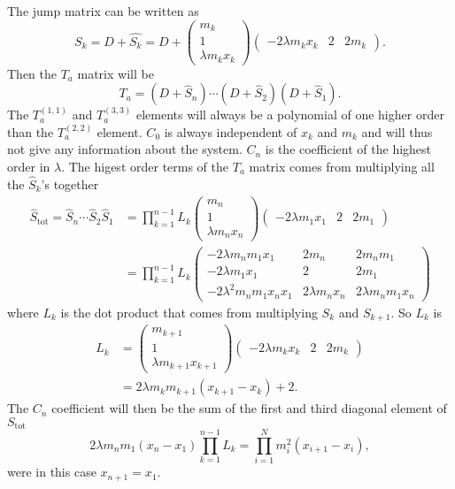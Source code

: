 \documentclass[english,master]{liumaiex}
\theoremstyle{plain}
\theoremstyle{definition}
\begin{document}
The jump matrix can be written as
\begin{equation}
	S_k = D + \hat{S_k} = D + 
	\begin{pmatrix}
		m_k \\ 1 \\ \lambda m_k x_k		
	\end{pmatrix}
	\begin{pmatrix}
		-2 \lambda m_k x_k & 2 & 2 m_k
	\end{pmatrix}.
\end{equation}
Then the $T_a$ matrix will be
\begin{equation}
	T_a = (D + \hat{S}_n)\cdots(D + \hat{S}_2)(D + \hat{S}_1).
\end{equation}
The $T_a^{(1,1)}$ and $T_a^{(3,3)}$ elements will always be a polynomial of one higher order than the $T_a^{(2,2)}$ element. $C_0$ is always independent of $x_k$ and $m_k$ and will thus not give any information about the system. $C_n$ is the coefficient of the highest order in $\lambda$. The higest order terms of the $T_a$ matrix comes from multiplying all the $\hat{S}_k$'s together
\begin{equation}
\begin{aligned}
	\hat{S}_{\text{tot}} = \hat{S}_n \cdots \hat{S}_2 \hat{S}_1 &=
	\prod_{k=1}^{n-1} L_k
	\begin{pmatrix}
		m_n \\ 1 \\ \lambda m_n x_n
	\end{pmatrix}
	\begin{pmatrix}
		-2\lambda m_1x_1 & 2 & 2 m_1
	\end{pmatrix} \\
	&= \prod_{k=1}^{n-1} L_k
	\begin{pmatrix}
		-2\lambda m_n m_1 x_1 & 2m_n & 2m_n m_1 \\
		-2\lambda m_1 x_1 & 2 & 2m_1 \\
		-2\lambda^2 m_n m_1 x_n x_1 & 2\lambda m_n x_n & 2\lambda m_n m_1 x_n
	\end{pmatrix}
\end{aligned}
\end{equation}
where $L_k$ is the dot product that comes from multiplying $S_k$ and $S_{k+1}$. So $L_k$ is
\begin{equation}
\begin{aligned}
	L_k &= 
	\begin{pmatrix}
		m_{k+1} \\ 1 \\ \lambda m_{k+1} x_{k+1}
	\end{pmatrix}
	\begin{pmatrix}
		-2\lambda m_kx_k & 2 & 2 m_k
	\end{pmatrix} \\
	&= 2\lambda m_k m_{k+1} (x_{k+1} - x_k) + 2.
\end{aligned}
\end{equation}
The $C_n$ coefficient will then be the sum of the first and third diagonal element of $S_{\text{tot}}$
\begin{equation}
	2\lambda m_n m_1 (x_n - x_1) \prod_{k=1}^{n-1} L_k
	= \prod_{i=1}^{N} m_i^2 (x_{i+1} - x_i),
\end{equation}
were in this case $x_{n+1} = x_1$.
\end{document}
